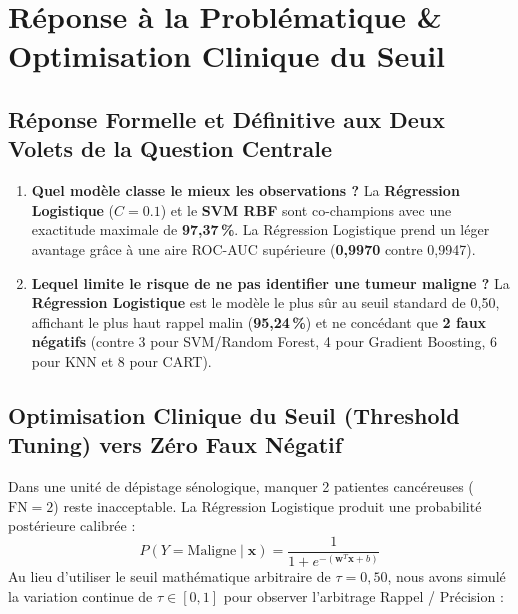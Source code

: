 \documentclass[10pt,a4paper]{article}
\begin{document}
\section{Réponse à la Problématique \& Optimisation Clinique du Seuil}

\subsection{Réponse Formelle et Définitive aux Deux Volets de la Question Centrale}
\begin{enumerate}[leftmargin=0.6cm, itemsep=3pt]
	\item \textbf{Quel modèle classe le mieux les observations ?}  
	La \textbf{Régression Logistique} ($C=0.1$) et le \textbf{SVM RBF} sont co-champions avec une exactitude maximale de \textbf{97,37\,\%}. La Régression Logistique prend un léger avantage grâce à une aire ROC-AUC supérieure (\textbf{0,9970} contre 0,9947).
	\item \textbf{Lequel limite le risque de ne pas identifier une tumeur maligne ?}  
	La \textbf{Régression Logistique} est le modèle le plus sûr au seuil standard de 0,50, affichant le plus haut rappel malin (\textbf{95,24\,\%}) et ne concédant que \textbf{2 faux négatifs} (contre 3 pour SVM/Random Forest, 4 pour Gradient Boosting, 6 pour KNN et 8 pour CART).
\end{enumerate}

\subsection{Optimisation Clinique du Seuil (Threshold Tuning) vers Zéro Faux Négatif}
Dans une unité de dépistage sénologique, manquer 2 patientes cancéreuses ($\text{FN}=2$) reste inacceptable.  
La Régression Logistique produit une probabilité postérieure calibrée :
$$P(Y = \text{Maligne} \mid \mathbf{x}) = \frac{1}{1 + e^{-(\mathbf{w}^T \mathbf{x} + b)}}$$
Au lieu d'utiliser le seuil mathématique arbitraire de $\tau = 0,50$, nous avons simulé la variation continue de $\tau \in [0, 1]$ pour observer l'arbitrage Rappel / Précision :
\end{document}
